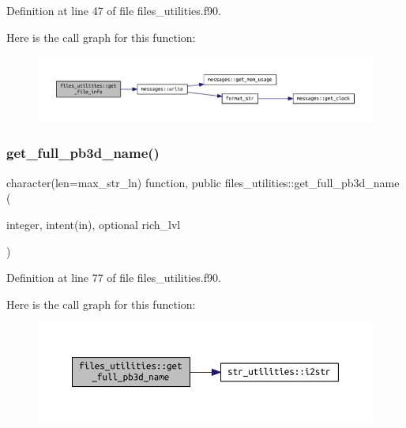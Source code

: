Definition at line 47 of file files\+\_\+utilities.\+f90.

Here is the call graph for this function\+:
\nopagebreak
\begin{figure}[H]
\begin{center}
\leavevmode
\includegraphics[width=350pt]{namespacefiles__utilities_a07f2e430ff33c1e291731ad64c1fe482_cgraph}
\end{center}
\end{figure}
\mbox{\label{namespacefiles__utilities_a43f1c2b7e128b1b2cdbcdb8963daab0e}} 
\subsubsection{\texorpdfstring{get\+\_\+full\+\_\+pb3d\+\_\+name()}{get\_full\_pb3d\_name()}}
{\footnotesize\ttfamily character(len=max\+\_\+str\+\_\+ln) function, public files\+\_\+utilities\+::get\+\_\+full\+\_\+pb3d\+\_\+name (\begin{DoxyParamCaption}\item[{integer, intent(in), optional}]{rich\+\_\+lvl }\end{DoxyParamCaption})}



Definition at line 77 of file files\+\_\+utilities.\+f90.

Here is the call graph for this function\+:
\nopagebreak
\begin{figure}[H]
\begin{center}
\leavevmode
\includegraphics[width=350pt]{namespacefiles__utilities_a43f1c2b7e128b1b2cdbcdb8963daab0e_cgraph}
\end{center}
\end{figure}
\mbox{\label{namespacefiles__utilities_ac6066df405564ba2f5e3c4bba726c1f8}} 
